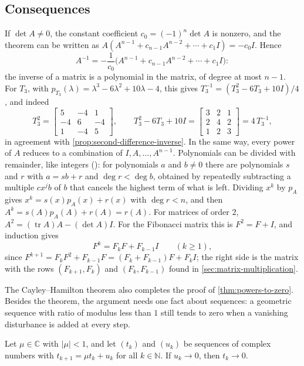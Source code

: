 \subsection{Consequences}

If $\det A\ne0$, the constant coefficient $c_0=(-1)^n\det A$ is nonzero, and the theorem can be written as $A(A^{n-1}+c_{n-1}A^{n-2}+\cdots+c_1I)=-c_0I$. Hence
\[
A^{-1}=-\frac1{c_0}\bigl(A^{n-1}+c_{n-1}A^{n-2}+\cdots+c_1I\bigr):
\]
the inverse of a matrix is a polynomial in the matrix, of degree at most $n-1$. For $T_3$, with $p_{T_3}(\lambda)=\lambda^3-6\lambda^2+10\lambda-4$, this gives $T_3^{-1}=(T_3^2-6T_3+10I)/4$, and indeed
\[
T_3^2=\begin{bmatrix}5&-4&1\\-4&6&-4\\1&-4&5\end{bmatrix},\qquad T_3^2-6T_3+10I=\begin{bmatrix}3&2&1\\2&4&2\\1&2&3\end{bmatrix}=4\,T_3^{-1},
\]
in agreement with \cref{prop:second-difference-inverse}. In the same way, every power of $A$ reduces to a combination of $I,A,\ldots,A^{n-1}$. Polynomials can be divided with remainder, like integers (): for polynomials $a$ and $b\ne0$ there are polynomials $s$ and $r$ with $a=sb+r$ and $\deg r<\deg b$, obtained by repeatedly subtracting a multiple $cx^jb$ of $b$ that cancels the highest term of what is left. Dividing $x^k$ by $p_A$ gives $x^k=s(x)p_A(x)+r(x)$ with $\deg r<n$, and then $A^k=s(A)p_A(A)+r(A)=r(A)$. For matrices of order $2$, $A^2=(\operatorname{tr}A)A-(\det A)I$. For the Fibonacci matrix this is $F^2=F+I$, and induction gives
\[
F^k=F_kF+F_{k-1}I\qquad(k\ge1),
\]
since $F^{k+1}=F_kF^2+F_{k-1}F=(F_k+F_{k-1})F+F_kI$; the right side is the matrix with the rows $(F_{k+1},F_k)$ and $(F_k,F_{k-1})$ found in \cref{sec:matrix-multiplication}.

The Cayley--Hamilton theorem also completes the proof of \cref{thm:powers-to-zero}. Besides the theorem, the argument needs one fact about sequences: a geometric sequence with ratio of modulus less than $1$ still tends to zero when a vanishing disturbance is added at every step.

\begin{lemma}
\label{lem:disturbed-geometric}
Let $\mu\in\mathbb C$ with $|\mu|<1$, and let $(t_k)$ and $(u_k)$ be sequences of complex numbers with $t_{k+1}=\mu t_k+u_k$ for all $k\in\mathbb N$. If $u_k\to0$, then $t_k\to0$.
\end{lemma}

